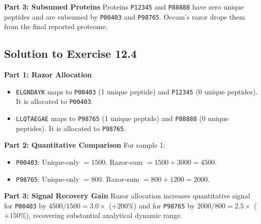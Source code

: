 \documentclass[11pt,twoside,openright]{book}
\begin{document}
\noindent\textbf{Part 3: Subsumed Proteins}\enspace
Proteins \texttt{P12345} and \texttt{P88888} have zero unique peptides and are subsumed by \texttt{P00403} and \texttt{P98765}. Occam's razor drops them from the final reported proteome.

\subsection{Solution to Exercise 12.4}

\noindent\textbf{Part 1: Razor Allocation}\enspace
\begin{itemize}
    \item \texttt{ELGNDAYK} maps to \texttt{P00403} (1 unique peptide) and \texttt{P12345} (0 unique peptides). It is allocated to \texttt{P00403}.
    \item \texttt{LLQTAEGAE} maps to \texttt{P98765} (1 unique peptide) and \texttt{P88888} (0 unique peptides). It is allocated to \texttt{P98765}.
\end{itemize}

\noindent\textbf{Part 2: Quantitative Comparison}\enspace
For sample 1:
\begin{itemize}
    \item \texttt{P00403}: Unique-only $= 1500$. Razor-sum $= 1500 + 3000 = 4500$.
    \item \texttt{P98765}: Unique-only $= 800$. Razor-sum $= 800 + 1200 = 2000$.
\end{itemize}

\noindent\textbf{Part 3: Signal Recovery Gain}\enspace
Razor allocation increases quantitative signal for \texttt{P00403} by $4500 / 1500 = 3.0\times$ ($+200\%$) and for \texttt{P98765} by $2000 / 800 = 2.5\times$ ($+150\%$), recovering substantial analytical dynamic range.

\end{document}
